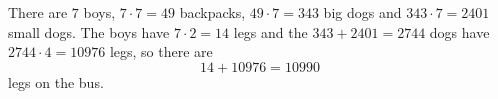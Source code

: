 There are $7$ boys, $7\cdot7=49$ backpacks, $49\cdot7=343$ big dogs and $343\cdot7=2401$ small dogs. The boys have $7\cdot2=14$ legs and the $343+2401=2744$ dogs have $2744\cdot4=10976$ legs, so there are
\[14+10976=\boxed{10990}\]
legs on the bus.

